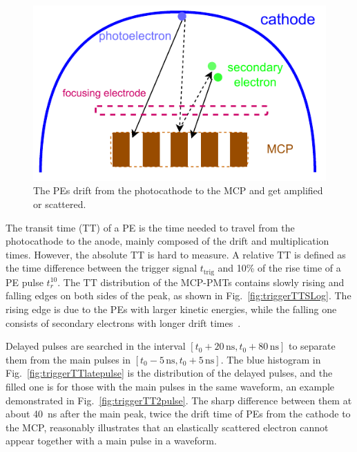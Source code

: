 \begin{figure}[!htbp]
    \centering
    \includegraphics[width=\MF\textwidth]{figures/method/MCPelectron.pdf}
    \caption{The PEs drift from the photocathode to the MCP and get amplified or scattered.}%
    \label{fig:mcpelectron}
\end{figure}

The transit time (TT) of a PE is the time needed to travel from the photocathode to the anode, mainly composed of the drift and multiplication times. However, the absolute TT is hard to measure. A relative $\mathrm{TT}$ is defined as the time difference between the trigger signal $t_{\mathrm{trig}}$ and 10\% of the rise time of a PE pulse $t_r^{10}$. The $\mathrm{TT}$ distribution of the MCP-PMTs contains slowly rising and falling edges on both sides of the peak, as shown in Fig.~\ref{fig:triggerTTSLog}. The rising edge is due to the PEs with larger kinetic energies, while the falling one consists of secondary electrons with longer drift times~\cite{longtail}.

Delayed pulses are searched in the interval $[t_0+20\,\mathrm{ns},t_0+80\,\mathrm{ns}]$ to separate them from the main pulses in $[t_0-5\,\mathrm{ns},t_0+5\,\mathrm{ns}]$. The blue histogram in Fig.~\ref{fig:triggerTTlatepulse} is the distribution of the delayed pulses, and the filled one is for those with the main pulses in the same waveform, an example demonstrated in Fig.~\ref{fig:triggerTT2pulse}. The sharp difference between them at about \SI{40}{ns} after the main peak, twice the drift time of PEs from the cathode to the MCP, reasonably illustrates that an elastically scattered electron cannot appear together with a main pulse in a waveform.

